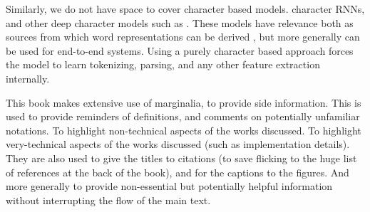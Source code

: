 \documentclass[12pt,parskip]{komatufte}
\begin{document}
Similarly, we do not have space to cover character based models.
character RNNs, and other deep character models such as .
These models have relevance both as sources from which word representations can be derived ,
but more generally can be used for end-to-end systems.
Using a purely character based approach forces the model to learn tokenizing, parsing, and any other feature extraction internally.



This book makes extensive use of marginalia, to provide side information.
This is used to provide reminders of definitions, and comments on potentially unfamiliar notations.
To highlight non-technical aspects of the works discussed.
To highlight very-technical aspects of the works discussed (such as implementation details).
They are also used to give the titles to citations (to save flicking to the huge list of references at the back of the book), and for the captions to the figures.
And more generally to provide non-essential  but potentially helpful information without interrupting the flow of the main text.
\end{document}
